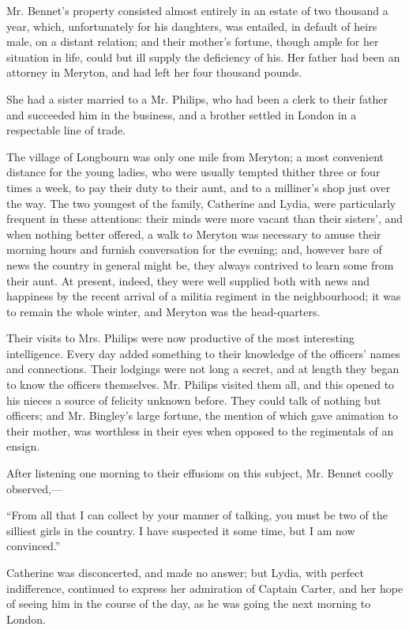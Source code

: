 Mr. Bennet's property consisted almost entirely in an estate of two thousand a year, which, unfortunately for his daughters, was entailed, in default of heirs male, on a distant relation; and their mother's fortune, though ample for her situation in life, could but ill supply the deficiency of his. Her father had been an attorney in Meryton, and had left her four thousand pounds.

She had a sister married to a Mr. Philips, who had been a clerk to their father and succeeded him in the business, and a brother settled in London in a respectable line of trade.

The village of Longbourn was only one mile from Meryton; a most convenient distance for the young ladies, who were usually tempted thither three or four times a week, to pay their duty to their aunt, and to a milliner's shop just over the way. The two youngest of the family, Catherine and Lydia, were particularly frequent in these attentions: their minds were more vacant than their sisters', and when nothing better offered, a walk to Meryton was necessary to amuse their morning hours and furnish conversation for the evening; and, however bare of news the country in general might be, they always contrived to learn some from their aunt. At present, indeed, they were well supplied both with news and happiness by the recent arrival of a militia regiment in the neighbourhood; it was to remain the whole winter, and Meryton was the head-quarters.

Their visits to Mrs. Philips were now productive of the most interesting intelligence. Every day added something to their knowledge of the officers' names and connections. Their lodgings were not long a secret, and at length they began to know the officers themselves. Mr. Philips visited them all, and this opened to his nieces a source of felicity unknown before. They could talk of nothing but officers; and Mr. Bingley's large fortune, the mention of which gave animation to their mother, was worthless in their eyes when opposed to the regimentals of an ensign.

After listening one morning to their effusions on this subject, Mr. Bennet coolly observed,---

``From all that I can collect by your manner of talking, you must be two of the silliest girls in the country. I have suspected it some time, but I am now convinced.''

Catherine was disconcerted, and made no answer; but Lydia, with perfect indifference, continued to express her admiration of Captain Carter, and her hope of seeing him in the course of the day, as he was going the next morning to London.

